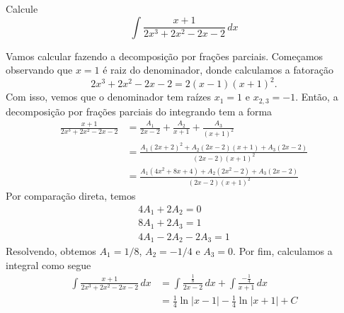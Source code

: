 \begin{exeresol}
  Calcule
  \begin{equation}
    \int\frac{x+1}{2x^3+2x^2-2x-2}\,dx
  \end{equation}
\end{exeresol}
\begin{resol}
  Vamos calcular fazendo a decomposição por frações parciais. Começamos observando que $x=1$ é raiz do denominador, donde calculamos a fatoração
  \begin{equation}
    2x^3+2x^2-2x-2 = 2(x-1)(x+1)^2.
  \end{equation}
  Com isso, vemos que o denominador tem raízes $x_1=1$ e $x_{2,3}=-1$. Então, a decomposição por frações parciais do integrando tem a forma
  \begin{align}
    \frac{x+1}{2x^3+2x^2-2x-2} &= \frac{A_1}{2x-2} + \frac{A_2}{x+1} + \frac{A_3}{(x+1)^2}\\
                               &= \frac{A_1(2x+2)^2+A_2(2x-2)(x+1)+A_3(2x-2)}{(2x-2)(x+1)^2}\\
                               &= \frac{A_1(4x^2+8x+4)+A_2(2x^2-2)+A_3(2x-2)}{(2x-2)(x+1)^2}
  \end{align}
  Por comparação direta, temos
  \begin{gather}
    4A_1+2A_2=0\\
    8A_1+2A_3=1\\
    4A_1-2A_2-2A_3=1
  \end{gather}
  Resolvendo, obtemos $A_1=1/8$, $A_2=-1/4$ e $A_3=0$. Por fim, calculamos a integral como segue
  \begin{align}
    \int\frac{x+1}{2x^3+2x^2-2x-2}\,dx &= \int\frac{\frac{1}{8}}{2x-2}\,dx + \int\frac{-\frac{1}{4}}{x+1}\,dx\\
                                       &= \frac{1}{4}\ln|x-1| - \frac{1}{4}\ln|x+1| + C
  \end{align}
\end{resol}

